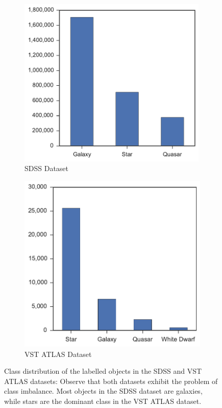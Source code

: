 \begin{figure}[tbp]
	\centering
	\begin{subfigure}{.5\textwidth}
		\centering
		\includegraphics[width=0.99\textwidth]{figures/2_astro/sdss_class_distribution}
		\caption{SDSS Dataset}
		\label{fig:class_dist_sdss}
	\end{subfigure}%
	\begin{subfigure}{.5\textwidth}
		\centering
		\includegraphics[width=0.99\linewidth]{figures/2_astro/vstatlas_class_distribution}
		\caption{VST ATLAS Dataset}
		\label{fig:class_dist_vst}
	\end{subfigure}
	\caption[Distribution of the classes in the SDSS and VST ATLAS datasets]{
		Class distribution of the labelled objects in the SDSS and VST ATLAS datasets: Observe
		that both datasets exhibit the problem of class imbalance. Most objects in the
		SDSS dataset are galaxies, while stars are the dominant class in the VST ATLAS dataset.}
	\label{fig:class_dist}
\end{figure}



